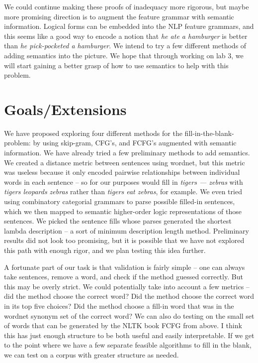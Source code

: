 \documentclass{article}[12pt]
\theoremstyle{definition}
\begin{document}
We could continue making these proofs of inadequacy more rigorous, but maybe more promising direction is to augment the feature grammar with semantic information. Logical forms can be embedded into the NLP feature grammars, and this seems like a good way to encode a notion that \emph{he ate a hamburger} is better than \emph{he pick-pocketed a hamburger}. We intend to try a few different methods of adding semantics into the picture. We hope that through working on lab 3, we will start gaining a better grasp of how to use semantics to help with this problem.


\section{Goals/Extensions}

We have proposed exploring four different methods for the fill-in-the-blank-problem: by using skip-gram, CFG’s, and FCFG’s augmented with semantic information. We have already tried a few preliminary methods to add semantics. We created a distance metric between sentences using wordnet, but this metric was useless because it only encoded pairwise relationships between individual words in each sentence -- so for our purposes would fill in \emph{tigers --- zebras} with \emph{tigers leopards zebras} rather than \emph{tigers eat zebras}, for example. We even tried using combinatory categorial grammars to parse possible filled-in sentences, which we then mapped to semantic higher-order logic representations of those sentences. We picked the sentence fills whose parses generated the shortest lambda description -- a sort of minimum description length method. Preliminary results did not look too promising, but it is possible that we have not explored this path with enough rigor, and we plan testing this idea further. \newline

A fortunate part of our task is that validation is fairly simple -- one can always take sentences, remove a word, and check if the method guessed correctly. But this may be overly strict. We could potentially take into account a few metrics --  did the method choose the correct word? Did the method choose the correct word in its top five choices? Did the method choose a fill-in word that was in the wordnet synonym set of the correct word? We can also do testing on the small set of words that can be generated by the NLTK book FCFG from above. I think this has just enough structure to be both useful and easily interpretable. If we get to the point where we have a few separate feasible algorithms to fill in the blank, we can test on a corpus with greater structure as needed. \newline
\end{document}
